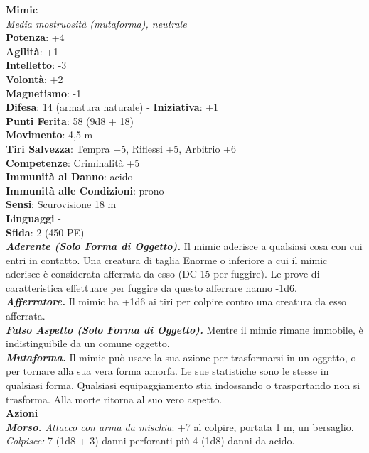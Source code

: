 \begin{multicols}{2}
\medskip\textbf{Mimic}\\
\emph{Media mostruosità (mutaforma), neutrale}\\
\textbf{Potenza}: +4\\
\textbf{Agilità}: +1\\
\textbf{Intelletto}: -3\\
\textbf{Volontà}: +2\\
\textbf{Magnetismo}: -1\\
\textbf{Difesa}: 14 (armatura naturale) - \textbf{Iniziativa}: +1\\
\textbf{Punti Ferita}: 58 (9d8 + 18)\\
\textbf{Movimento}: 4,5 m\\
\textbf{Tiri Salvezza}: Tempra +5, Riflessi +5, Arbitrio +6\\
\textbf{Competenze}: Criminalità +5\\
\textbf{Immunità al Danno}: acido\\
\textbf{Immunità alle Condizioni}: prono\\
\textbf{Sensi}: Scurovisione 18 m\\
\textbf{Linguaggi} -\\
\textbf{Sfida}: 2 (450 PE)\smallskip\\
\emph{\textbf{Aderente (Solo Forma di Oggetto).}} Il mimic aderisce a qualsiasi cosa con cui entri in contatto. Una creatura di taglia Enorme o inferiore a cui il mimic aderisce è considerata afferrata da esso (DC  15 per fuggire). Le prove di caratteristica effettuare per fuggire da questo afferrare hanno -1d6.\\
\emph{\textbf{Afferratore.}} Il mimic ha +1d6 ai tiri per colpire contro una creatura da esso afferrata.\\
\emph{\textbf{Falso Aspetto (Solo Forma di Oggetto).}} Mentre il mimic rimane immobile, è indistinguibile da un comune oggetto.\\
\emph{\textbf{Mutaforma.}} Il mimic può usare la sua azione per trasformarsi in un oggetto, o per tornare alla sua vera forma amorfa. Le sue statistiche sono le stesse in qualsiasi forma. Qualsiasi equipaggiamento stia indossando o trasportando non si trasforma. Alla morte ritorna al suo vero aspetto.\\
\smallskip\textbf{Azioni}\\
\emph{\textbf{Morso.} Attacco con arma da mischia}: +7 al colpire, portata 1 m, un bersaglio.\\
\emph{Colpisce:} 7 (1d8 + 3) danni perforanti più 4 (1d8) danni da acido.\\

\end{multicols}
